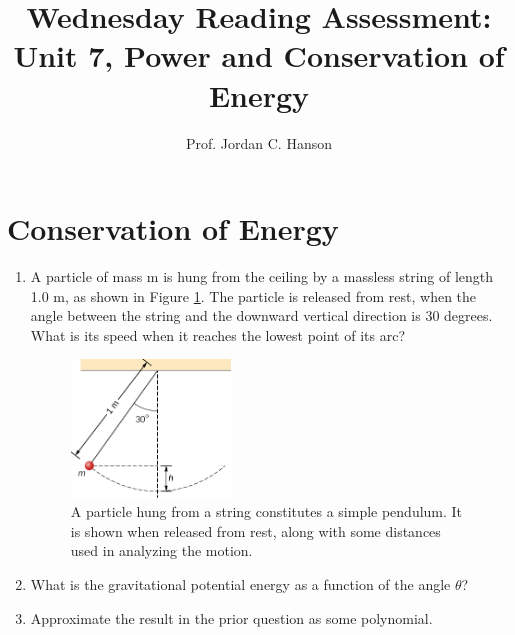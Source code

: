 \documentclass{article}
\begin{document}
\title{Wednesday Reading Assessment: Unit 7, Power and Conservation of Energy}
\author{Prof. Jordan C. Hanson}

\maketitle

\section{Conservation of Energy}

\begin{enumerate}
\item A particle of mass m is hung from the ceiling by a massless string of length 1.0 m, as shown in Figure \ref{fig:pend}. The particle is released from rest, when the angle between the string and the downward vertical direction is 30 degrees.  What is its speed when it reaches the lowest point of its arc?
\begin{figure}[ht]
\centering
\includegraphics[width=0.4\textwidth]{pend.png}
\caption{\label{fig:pend} A particle hung from a string constitutes a simple pendulum. It is shown when released from rest, along with some distances used in analyzing the motion.}
\end{figure}
\item What is the gravitational potential energy as a function of the angle $\theta$? \\ \vspace{2cm}
\item Approximate the result in the prior question as some polynomial.
\end{enumerate}
\end{document}
